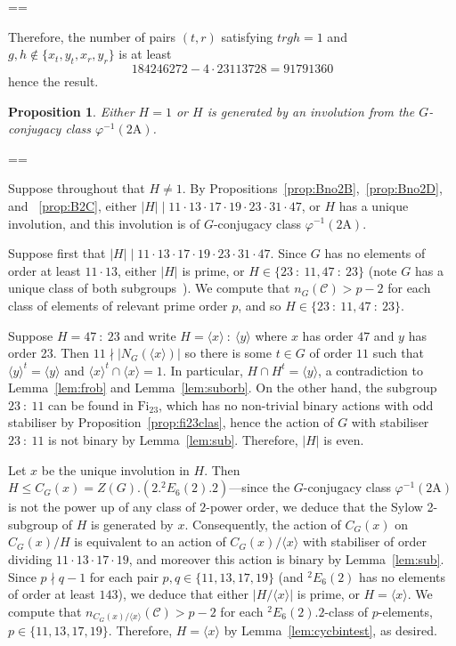 \documentclass[11pt, a4paper]{amsart}
\makeatletter
\def\cn{\mathord{{\!\:{:}\:\!}}}
\newtheorem{prop}[thm]{Proposition}
\renewcommand{\proofname}{Proof}
\renewenvironment{proof}[1][\proofname]{\par
  \pushQED{\qed}  \normalfont \partopsep=\z@skip \topsep=\z@skip
  \trivlist
  \item[\hskip\labelsep
        \scshape
    #1\@addpunct{.}]\ignorespaces
}{  \popQED\endtrivlist\@endpefalse
}
\makeatother
\begin{document}
\begin{proof}
Therefore, the number of pairs $(t,r)$ satisfying $trgh=1$ and $g,h\not\in\{x_t,y_t,x_r,y_r\}$ is at least $$184246272
-4\cdot23113728=91791360$$ hence the result.\end{proof}

\begin{prop}\label{prop:Bclas}
    Either $H=1$ or $H$ is generated by an involution from the $G$-conjugacy class $\varphi^{-1}(2\mathrm{A})$.
\end{prop}
\begin{proof}
    Suppose throughout that $H\ne 1$. By Propositions~\ref{prop:Bno2B},~\ref{prop:Bno2D}, and ~\ref{prop:B2C}, either $|H|\mid 11\cdot13\cdot17\cdot19\cdot23\cdot31\cdot47$, or $H$ has a unique involution, and this involution is of $G$-conjugacy class $\varphi^{-1}(\mathrm{2A})$.

    Suppose first that $|H|\mid 11\cdot13\cdot17\cdot19\cdot23\cdot31\cdot47$. Since $G$ has no elements of order at least $11\cdot 13$, either $|H|$ is prime, or $H\in\{23\cn11,47\cn23\}$ (note $G$ has a unique class of both subgroups~\cite{W99}). We compute that $n_G(\mathcal{C})>p-2$ for each class of elements of relevant prime order $p$, and so $H\in\{23\cn11,47\cn23\}$. 
    
    Suppose $H=47\cn23$ and write $H=\langle x\rangle\cn\langle y\rangle$ where $x$ has order $47$ and $y$ has order 23. Then $11\nmid |N_G(\langle x\rangle)|$ so there is some $t\in G$ of order $11$ such that $\langle y\rangle^t=\langle y\rangle$ and $\langle x\rangle^t\cap\langle x\rangle=1.$ In particular, $H\cap H^t=\langle y\rangle$, a contradiction to Lemma~\ref{lem:frob} and Lemma~\ref{lem:suborb}. On the other hand, the subgroup $23\cn11$ can be found in $\mathrm{Fi}_{23}$, which has no non-trivial binary actions with odd stabiliser by Proposition~\ref{prop:fi23clas}, hence the action of $G$ with stabiliser $23\cn11$ is not binary by Lemma~\ref{lem:sub}. Therefore, $|H|$ is even.

    Let $x$ be the unique involution in $H$. Then $H\leq C_G(x)=Z(G).(2.{}^2E_6(2).2)$---since the $G$-conjugacy class $\varphi^{-1}(\mathrm{2A})$ is not the power up of any class of $2$-power order, we deduce that the Sylow 2-subgroup of $H$ is generated by $x$. Consequently, the action of $C_G(x)$ on $C_G(x)/H$ is equivalent to an action of $C_G(x)/\langle x\rangle$ with stabiliser of order dividing $11\cdot 13\cdot17\cdot19$, and moreover this action is binary by Lemma~\ref{lem:sub}. Since $p\nmid q-1$ for each pair $p,q\in\{11,13,17,19\}$ (and ${}^2E_6(2)$ has no elements of order at least $143$), we deduce that either $|H/\langle x\rangle|$ is prime, or $H=\langle x\rangle$. We compute that $n_{C_G(x)/\langle x\rangle}(\mathcal{C})>p-2$ for each ${}^2E_6(2).2$-class of $p$-elements, $p\in\{11,13,17,19\}$. Therefore, $H=\langle x\rangle$ by Lemma~\ref{lem:cycbintest}, as desired. 
\end{proof}
\end{document}
